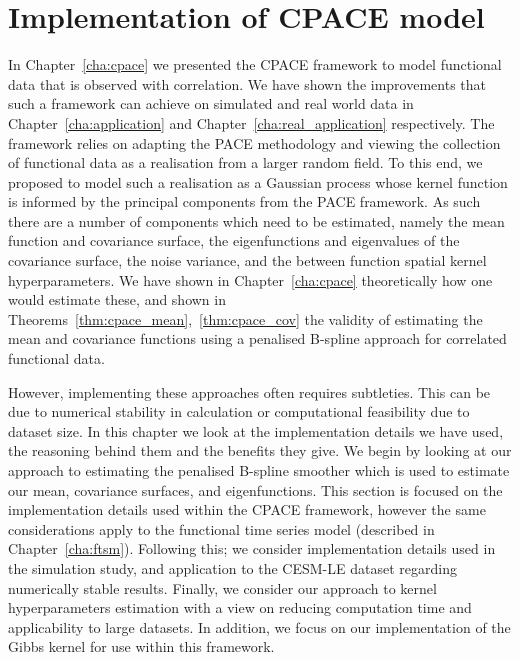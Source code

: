 
\chapter{Implementation of CPACE model \label{cha:implementation}}  %

\ifpdf
	\graphicspath{{Chapter8/Figs/Raster/}{Chapter8/Figs/PDF/}{Chapter8/Figs/}}
\else
	\graphicspath{{Chapter8/Figs/Vector/}{Chapter8/Figs/}}
\fi

In Chapter~\ref{cha:cpace} we presented the CPACE framework to model functional data that is observed with correlation.
We have shown the improvements that such a framework can achieve on simulated and real world data in Chapter~\ref{cha:application} and Chapter~\ref{cha:real_application} respectively.
The framework relies on adapting the PACE methodology and viewing the collection of functional data as a realisation from a larger random field.
To this end, we proposed to model such a realisation as a Gaussian process whose kernel function is informed by the principal components from the PACE framework.
As such there are a number of components which need to be estimated, namely the mean function and covariance surface, the eigenfunctions and eigenvalues of the covariance surface, the noise variance, and the between function spatial kernel hyperparameters.
We have shown in Chapter~\ref{cha:cpace} theoretically how one would estimate these, and shown in Theorems~\ref{thm:cpace_mean},~\ref{thm:cpace_cov} the validity of estimating the mean and covariance functions using a penalised B-spline approach for correlated functional data.

However, implementing these approaches often requires subtleties.
This can be due to numerical stability in calculation or computational feasibility due to dataset size.
In this chapter we look at the implementation details we have used, the reasoning behind them and the benefits they give.
We begin by looking at our approach to estimating the penalised B-spline smoother which is used to estimate our mean, covariance surfaces, and eigenfunctions.
This section is focused on the implementation details used within the CPACE framework, however the same considerations apply to the functional time series model (described in Chapter~\ref{cha:ftsm}).
Following this; we consider implementation details used in the simulation study, and application to the CESM-LE dataset regarding numerically stable results.
Finally, we consider our approach to kernel hyperparameters estimation with a view on reducing computation time and applicability to large datasets.
In addition, we focus on our implementation of the Gibbs kernel for use within this framework.

